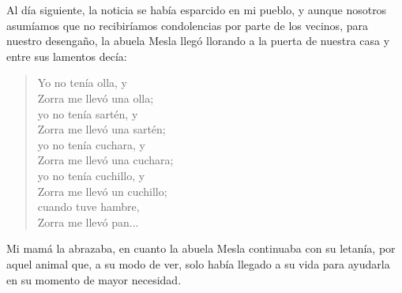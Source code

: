 Al día siguiente, la noticia se había esparcido en mi pueblo, y aunque nosotros asumíamos que no recibiríamos condolencias por parte de los vecinos, para nuestro desengaño, la abuela Mesla llegó llorando a la puerta de nuestra casa y entre sus lamentos decía:
\begin{quotation}
\noindent Yo no tenía olla, y \\Zorra me llevó una olla;\\ 
yo no tenía sartén, y \\Zorra me llevó una sartén;\\ 
yo no tenía cuchara, y \\Zorra me llevó una cuchara;\\
yo no tenía cuchillo, y \\Zorra me llevó un cuchillo;\\
cuando tuve hambre, \\Zorra me llevó pan...  
\end{quotation}
Mi mamá la abrazaba, en cuanto la abuela Mesla continuaba con su letanía, por aquel animal que, a su modo de ver, solo había llegado a su vida para ayudarla en su momento de mayor necesidad.

